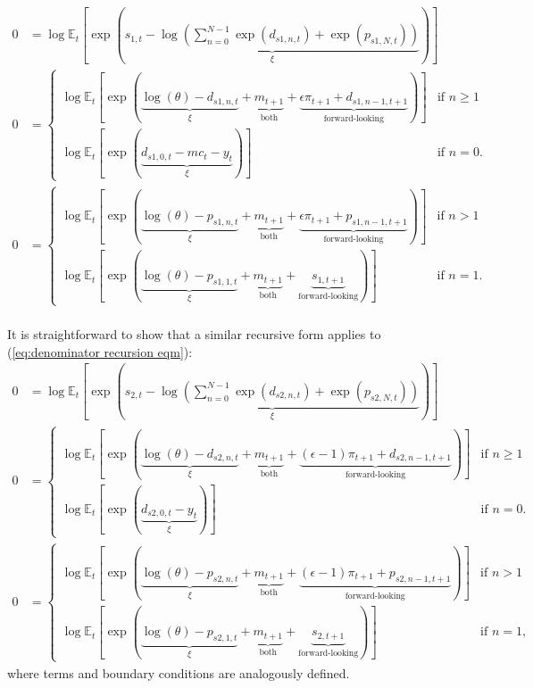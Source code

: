 \documentclass[12 pt, oneside]{article}
\theoremstyle{definition}
\theoremstyle{definition}
\theoremstyle{definition}
\newcommand{\E}{\mathbb{E}}
\begin{document}
\begin{align}
  0 & = \log\E_t\left[\exp\left(\underbrace{s_{1, t} - \log\left(\sum_{n = 0}^{N - 1}\exp(d_{s1, n, t}) + \exp(p_{s1, N, t})\right)}_{\xi}\right)\right]\\
  0 & =
      \begin{cases}
        \log\E_t\left[\exp\left(\underbrace{\log(\theta) - d_{s1, n, t}}_{\xi} + \underbrace{m_{t + 1}}_{\text{both}} + \underbrace{\epsilon \pi_{t + 1} + d_{s1, n - 1, t + 1}}_{\text{forward-looking}}\right)\right] & \text{if } n \geq 1\\
        \log\E_t\left[\exp\left(\underbrace{d_{s1, 0, t} - mc_t - y_t}_{\xi}\right)\right] & \text{if } n = 0.
      \end{cases}\\
  0 & =
      \begin{cases}
        \log\E_t\left[\exp\left(\underbrace{\log(\theta) - p_{s1, n, t}}_{\xi} + \underbrace{m_{t + 1}}_{\text{both}} + \underbrace{\epsilon \pi_{t + 1} + p_{s1, n - 1, t + 1}}_{\text{forward-looking}} \right)\right] & \text{if } n > 1\\
        \log\E_t\left[\exp\left(\underbrace{\log(\theta) - p_{s1, 1, t}}_{\xi} + \underbrace{m_{t + 1}}_{\text{both}} + \underbrace{s_{1, t + 1}}_{\text{forward-looking}}\right)\right] & \text{if } n = 1.
      \end{cases}
\end{align}
\\

It is straightforward to show that a similar recursive form applies to (\ref{eq:denominator recursion eqm}):
\begin{align}
  0 & = \log\E_t\left[\exp\left(\underbrace{s_{2, t} - \log\left(\sum_{n = 0}^{N - 1}\exp(d_{s2, n, t}) + \exp(p_{s2, N, t})\right)}_{\xi}\right)\right]\\
  0 & =
      \begin{cases}
        \log\E_t\left[\exp\left(\underbrace{\log(\theta) - d_{s2, n, t}}_{\xi} + \underbrace{m_{t + 1}}_{\text{both}} + \underbrace{(\epsilon - 1) \pi_{t + 1} + d_{s2, n - 1, t + 1}}_{\text{forward-looking}}\right)\right] & \text{if } n \geq 1\\
        \log\E_t\left[\exp\left(\underbrace{d_{s2, 0, t} - y_t}_{\xi}\right)\right] & \text{if } n = 0.
      \end{cases}\\
  0 & =
      \begin{cases}
        \log\E_t\left[\exp\left(\underbrace{\log(\theta) - p_{s2, n, t}}_{\xi} + \underbrace{m_{t + 1}}_{\text{both}} + \underbrace{(\epsilon - 1) \pi_{t + 1} + p_{s2, n - 1, t + 1}}_{\text{forward-looking}} \right)\right] & \text{if } n > 1\\
        \log\E_t\left[\exp\left(\underbrace{\log(\theta) - p_{s2, 1, t}}_{\xi} + \underbrace{m_{t + 1}}_{\text{both}} + \underbrace{s_{2, t + 1}}_{\text{forward-looking}}\right)\right] & \text{if } n = 1,
      \end{cases}
\end{align}
where terms and boundary conditions are analogously defined.
\end{document}
